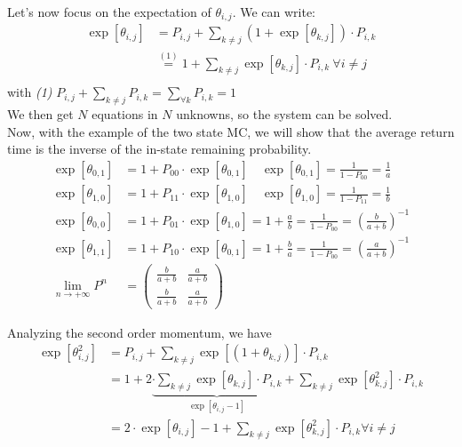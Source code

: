 Let's now focus on the expectation of $\theta_{i,j}$. We can write:
\begin{equation}\begin{split}
	\exp[\theta_{i,j}] &= P_{i,j} + \sum\limits_{k \neq j} (1+\exp[\theta_{k,j}])\cdot P_{i,k}\\
	&\stackrel{(1)}{=} 1+ \sum\limits_{k \neq j} \exp[\theta_{k,j}] \cdot P_{i,k} ~\forall i \neq j\\
\end{split}\end{equation}
with \textit{(1)} $P_{i,j} + \sum\limits_{k\neq j}P_{i,k} =\sum\limits_{\forall k}P_{i,k} = 1 $
\\
We then get $N$ equations in $N$ unknowns, so the system can be solved.
\\
Now, with the example of the two state MC, we will show that the average return
time is the inverse of the in-state remaining probability.
\begin{equation}\begin{split}
	\exp[\theta_{0,1}] &= 1 + P_{00} \cdot \exp[\theta_{0,1}] \quad \exp[\theta_{0,1}] = \frac{1}{1-P_{00}} = \frac{1}{a}\\
	\exp[\theta_{1,0}] &= 1 + P_{11} \cdot \exp[\theta_{1,0}] \quad \exp[\theta_{1,0}] = \frac{1}{1-P_{11}} = \frac{1}{b}\\
	\exp[\theta_{0,0}] &= 1 + P_{01} \cdot \exp[\theta_{1,0}] =1+\frac{a}{b} = \frac{1}{1-P_{00}} = \left(\frac{b}{a+b}\right)^{-1}\\
	\exp[\theta_{1,1}] &= 1 + P_{10} \cdot \exp[\theta_{0,1}] =1+\frac{b}{a} = \frac{1}{1-P_{00}} = \left(\frac{a}{a+b}\right)^{-1}\\
	\lim_{n \to +\infty} P^n &=
	\begin{pmatrix}
		\frac{b}{a+b} & \frac{a}{a+b} \\
		\frac{b}{a+b} & \frac{a}{a+b}
	\end{pmatrix}
\end{split}\end{equation}

Analyzing the second order momentum, we have
\begin{equation}\begin{split}
	\exp[\theta_{i,j}^2] &= P_{i,j} + \sum\limits_{k \neq j} \exp[(1+\theta_{k,j})]\cdot P_{i,k}\\
	&= 1 + 2 \underbrace{\cdot \sum\limits_{k \neq j} \exp[\theta_{k,j}]\cdot P_{i,k}}_{\exp[\theta_{i,j}-1]} + \sum\limits_{k \neq j} \exp[\theta_{k,j}^2] \cdot P_{i,k}\\
	&= 2 \cdot \exp[\theta_{i,j}]-1 +  \sum\limits_{k \neq j} \exp[\theta_{k,j}^2] \cdot P_{i,k} \forall i \neq j \\
\end{split}\end{equation}

